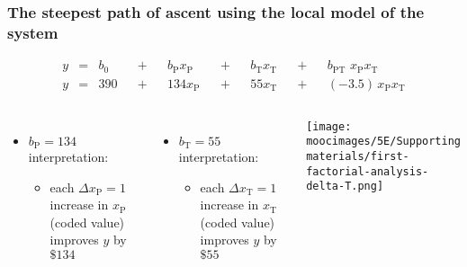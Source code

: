 \documentclass[handout,11pt,aspectratio=169,mathserif]{beamer}
\begin{document}
\begin{frame}\frametitle{The steepest {\color{myOrange}path of ascent} using the local model of the system}

	\begin{exampleblock}{}
		\begin{align*} 
			y &=& b_0 &&+&& b_\text{P} x_\text{P} &&+&& b_\text{T} x_\text{T} &&+&& b_\text{PT}\,\,x_\text{P}x_\text{T} \\
			y &=& 390 &&+&& 134 x_\text{P}        &&+&& 55 x_\text{T}         &&+&& (-3.5)\,x_\text{P}x_\text{T} 
		\end{align*}		
	\end{exampleblock}
	
	\begin{columns}[c]
			\begin{itemize}
				\item	$b_\text{P} =134$ interpretation:
				\begin{itemize}
					\item	each $\Delta x_\text{P} = 1$ increase in $x_\text{P}$ (coded value) improves $y$ by $\$134$
				\end{itemize}
			\end{itemize}
			\pause
			\begin{itemize}
				\item	$b_\text{T} = 55$ interpretation:
				\begin{itemize}
					\item	each $\Delta x_\text{T} = 1$ increase in $x_\text{T}$ (coded value)  improves $y$ by $\$55$
				\end{itemize}
			\end{itemize}
			\centerline{\texttt{[image: \\moocimages/5E/Supporting materials/first-factorial-analysis-delta-T.png]}}
	\end{columns}
\end{frame}
\end{document}
